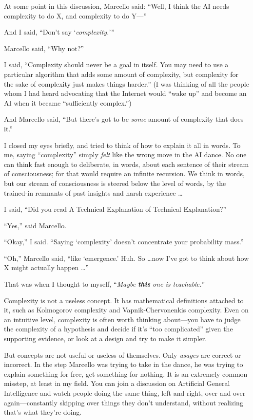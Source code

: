 {
 At some point in this discussion, Marcello said:
``Well, I think the AI needs complexity to do X, and
complexity to do Y---''}

{
 And I said, ``Don't say
`\textit{complexity.}'''}

{
 Marcello said, ``Why not?''}

{
 I said, ``Complexity should never be a goal in
itself. You may need to use a particular algorithm that adds some
amount of complexity, but complexity for the sake of complexity just
makes things harder.'' (I was thinking of all the
people whom I had heard advocating that the Internet would
``wake up'' and become an AI when it
became ``sufficiently complex.'')}

{
 And Marcello said, ``But there's
got to be \textit{some} amount of complexity that does
it.''}

{
 I closed my eyes briefly, and tried to think of how to explain it
all in words. To me, saying
``complexity'' simply \textit{felt}
like the wrong move in the AI dance. No one can think fast enough to
deliberate, in words, about each sentence of their stream of
consciousness; for that would require an infinite recursion. We think
in words, but our stream of consciousness is steered below the level of
words, by the trained-in remnants of past insights and harsh experience
\ldots}

{
 I said, ``Did you read A Technical Explanation of
Technical Explanation?''}

{
 ``Yes,'' said Marcello.}

{
 ``Okay,'' I said.
``Saying `complexity'
doesn't concentrate your probability
mass.''}

{
 ``Oh,'' Marcello said,
``like `emergence.'
Huh. So \ldots now I've got to think about how X might
actually happen \ldots''}

{
 That was when I thought to myself,
``\textit{Maybe }\textbf{\textit{this}}\textit{ one is
teachable.}''}

{
 Complexity is not a useless concept. It has mathematical
definitions attached to it, such as Kolmogorov complexity and
Vapnik-Chervonenkis complexity. Even on an intuitive level, complexity
is often worth thinking about---you have to judge the complexity of a
hypothesis and decide if it's ``too
complicated'' given the supporting evidence, or look
at a design and try to make it simpler.}

{
 But concepts are not useful or useless of themselves. Only
\textit{usages} are correct or incorrect. In the step Marcello was
trying to take in the dance, he was trying to explain something for
free, get something for nothing. It is an extremely common misstep, at
least in my field. You can join a discussion on Artificial General
Intelligence and watch people doing the same thing, left and right,
over and over again---constantly skipping over things they
don't understand, without realizing
that's what they're doing.}

